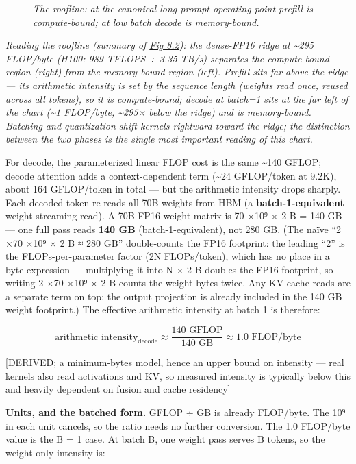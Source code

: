 \begin{figure}
\label{fig:8.2}\emph{The roofline: at the canonical long-prompt operating point prefill
is compute-bound; at low batch decode is memory-bound.}

\end{figure}\emph{Reading the roofline (summary of \hyperref[fig:8.2]{Fig 8.2}): the dense-FP16 ridge at
\textasciitilde295 FLOP/byte (H100: 989 TFLOPS ÷ 3.35 TB/s) separates
the compute-bound region (right) from the memory-bound region (left).
Prefill sits far above the ridge --- its arithmetic intensity is set by
the sequence length (weights read once, reused across all tokens), so it
is compute-bound; decode at batch=1 sits at the far left of the chart
(\textasciitilde1 FLOP/byte, \textasciitilde295× below the ridge) and is
memory-bound. Batching and quantization shift kernels rightward toward
the ridge; the distinction between the two phases is the single most
important reading of this chart.}

For decode, the parameterized linear FLOP cost is the same
\textasciitilde140 GFLOP; decode attention adds a context-dependent term
(\textasciitilde24 GFLOP/token at 9.2K), about 164 GFLOP/token in total
--- but the arithmetic intensity drops sharply. Each decoded token
re-reads all 70B weights from HBM (a \textbf{batch-1-equivalent}
weight-streaming read). A 70B FP16 weight matrix is 70 ×10⁹ × 2 B = 140
GB --- one full pass reads \textbf{140 GB} (batch-1-equivalent), not 280
GB. (The naïve ``2 ×70 ×10⁹ × 2 B ≈ 280 GB'' double-counts the FP16
footprint: the leading ``2'' is the FLOPs-per-parameter factor (2N
FLOPs/token), which has no place in a byte expression --- multiplying it
into N × 2 B doubles the FP16 footprint, so writing 2 ×70 ×10⁹ × 2 B
counts the weight bytes twice. Any KV-cache reads are a separate term on
top; the output projection is already included in the 140 GB weight
footprint.) The effective arithmetic intensity at batch 1 is therefore:

\[
\text{arithmetic intensity}_{\text{decode}} \approx \frac{140 \text{ GFLOP}}{140 \text{ GB}} \approx 1.0 \text{ FLOP/byte}
\]

{[}DERIVED; a minimum-bytes model, hence an upper bound on intensity ---
real kernels also read activations and KV, so measured intensity is
typically below this and heavily dependent on fusion and cache
residency{]}

\textbf{Units, and the batched form.} GFLOP ÷ GB is already FLOP/byte.
The 10⁹ in each unit cancels, so the ratio needs no further conversion.
The 1.0 FLOP/byte value is the B = 1 case. At batch B, one weight pass
serves B tokens, so the weight-only intensity is:

